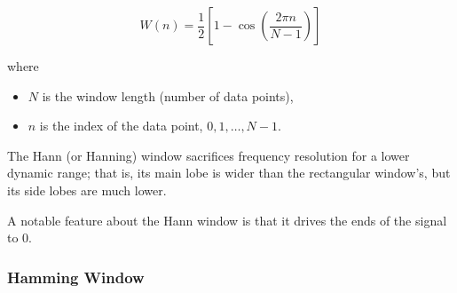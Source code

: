 \vsp

\begin{center}
\end{center}

\begin{equation*}
    W(n) = \frac{1}{2}\left[1 - \cos\left(\frac{2\pi n}{N-1}\right)\right]
\end{equation*}

where

\begin{itemize}
    \item $N$ is the window length (number of data points),
    \item $n$ is the index of the data point, $0, 1, \dots, N-1$.
\end{itemize}

The Hann (or Hanning) window sacrifices frequency resolution for a lower dynamic range; that is, its main lobe is wider than the rectangular window's, but its side lobes are much lower.

\vsp

A notable feature about the Hann window is that it drives the ends of the signal to 0.

\subsubsection{Hamming Window}

\vsp

